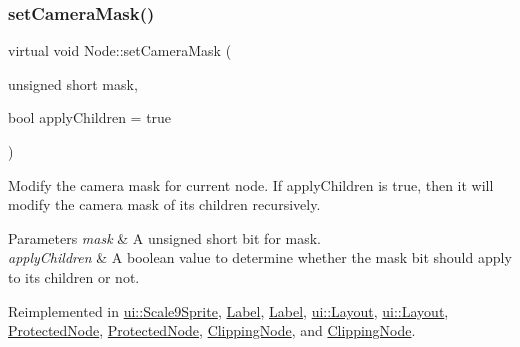 \mbox{\label{classNode_ad9901c9b33e733877b2c4a47af38787d}} 
\subsubsection{\texorpdfstring{set\+Camera\+Mask()}{setCameraMask()}\hspace{0.1cm}{\footnotesize\ttfamily [2/2]}}
{\footnotesize\ttfamily virtual void Node\+::set\+Camera\+Mask (\begin{DoxyParamCaption}\item[{unsigned short}]{mask,  }\item[{bool}]{apply\+Children = {\ttfamily true} }\end{DoxyParamCaption})\hspace{0.3cm}{\ttfamily [virtual]}}

Modify the camera mask for current node. If apply\+Children is true, then it will modify the camera mask of its children recursively. 
\begin{DoxyParams}{Parameters}
{\em mask} & A unsigned short bit for mask. \\
\hline
{\em apply\+Children} & A boolean value to determine whether the mask bit should apply to its children or not. \\
\hline
\end{DoxyParams}


Reimplemented in \hyperlink{classui_1_1Scale9Sprite_ab871c3756134c9f991876cd78ae1ef03}{ui\+::\+Scale9\+Sprite}, \hyperlink{classLabel_a8657a6d35049d6e66a79759f93890a6d}{Label}, \hyperlink{classLabel_a2766bd9d3aa727ee7c50d730af35b9dc}{Label}, \hyperlink{classui_1_1Layout_a7468a69a70aa481c7a429db365f0362c}{ui\+::\+Layout}, \hyperlink{classui_1_1Layout_a38e44717b8af16b5b5c1f299081ae854}{ui\+::\+Layout}, \hyperlink{classProtectedNode_ad259bd1bedc5f273b3850c74dc58c2f2}{Protected\+Node}, \hyperlink{classProtectedNode_a45ddaa88c746ea6707b8a09bb50b457d}{Protected\+Node}, \hyperlink{classClippingNode_a1a2f97b7a006e6b830632eab1e812f90}{Clipping\+Node}, and \hyperlink{classClippingNode_afced4609ebbd5d239d1e3d07b6d4b217}{Clipping\+Node}.

\mbox{\label{classNode_a4e7f2dde1e3a7d56880f59f1480955e7}} 
